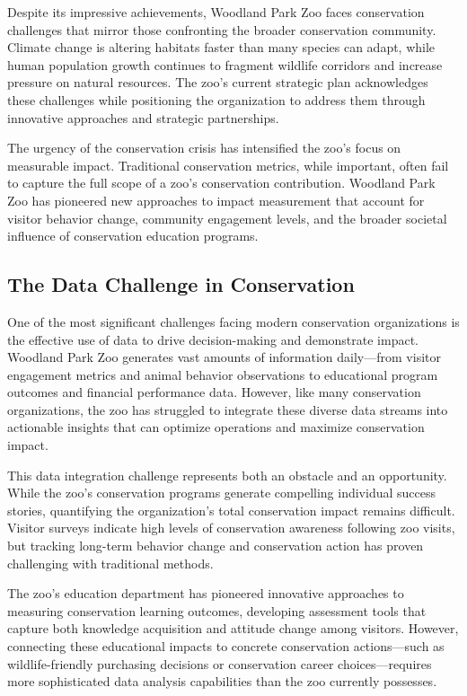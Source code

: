 \documentclass[
  Letterpaper,
]{scrbook}
\begin{document}
Despite its impressive achievements, Woodland Park Zoo faces
conservation challenges that mirror those confronting the broader
conservation community. Climate change is altering habitats faster than
many species can adapt, while human population growth continues to
fragment wildlife corridors and increase pressure on natural resources.
The zoo's current strategic plan acknowledges these challenges while
positioning the organization to address them through innovative
approaches and strategic partnerships.

The urgency of the conservation crisis has intensified the zoo's focus
on measurable impact. Traditional conservation metrics, while important,
often fail to capture the full scope of a zoo's conservation
contribution. Woodland Park Zoo has pioneered new approaches to impact
measurement that account for visitor behavior change, community
engagement levels, and the broader societal influence of conservation
education programs.

\subsection{The Data Challenge in
Conservation}\label{the-data-challenge-in-conservation}

One of the most significant challenges facing modern conservation
organizations is the effective use of data to drive decision-making and
demonstrate impact. Woodland Park Zoo generates vast amounts of
information daily---from visitor engagement metrics and animal behavior
observations to educational program outcomes and financial performance
data. However, like many conservation organizations, the zoo has
struggled to integrate these diverse data streams into actionable
insights that can optimize operations and maximize conservation impact.

This data integration challenge represents both an obstacle and an
opportunity. While the zoo's conservation programs generate compelling
individual success stories, quantifying the organization's total
conservation impact remains difficult. Visitor surveys indicate high
levels of conservation awareness following zoo visits, but tracking
long-term behavior change and conservation action has proven challenging
with traditional methods.

The zoo's education department has pioneered innovative approaches to
measuring conservation learning outcomes, developing assessment tools
that capture both knowledge acquisition and attitude change among
visitors. However, connecting these educational impacts to concrete
conservation actions---such as wildlife-friendly purchasing decisions or
conservation career choices---requires more sophisticated data analysis
capabilities than the zoo currently possesses.
\end{document}
